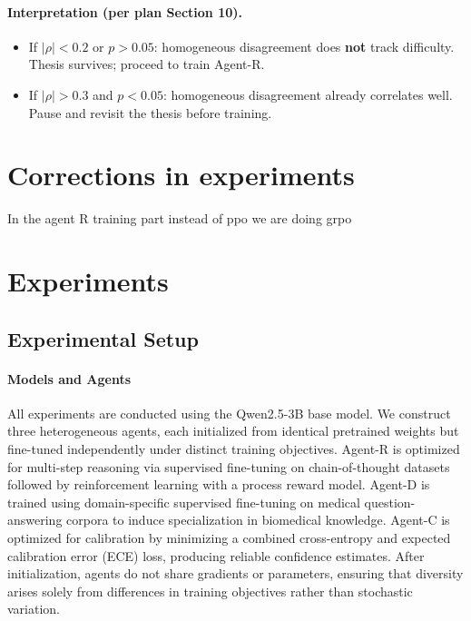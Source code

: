\documentclass{article}
\begin{document}
\paragraph{Interpretation (per plan Section 10).}
\begin{itemize}
    \item If $|\rho| < 0.2$ or $p > 0.05$: homogeneous disagreement does \textbf{not} track difficulty. Thesis survives; proceed to train Agent-R.
    \item If $|\rho| > 0.3$ and $p < 0.05$: homogeneous disagreement already correlates well. Pause and revisit the thesis before training.
\end{itemize}
\section{Corrections in experiments}
In the agent R training part instead of ppo we are doing grpo
\section{Experiments}

\subsection{Experimental Setup}

\paragraph{Models and Agents}
All experiments are conducted using the Qwen2.5-3B base model. We construct three heterogeneous agents, each initialized from identical pretrained weights but fine-tuned independently under distinct training objectives. Agent-R is optimized for multi-step reasoning via supervised fine-tuning on chain-of-thought datasets followed by reinforcement learning with a process reward model. Agent-D is trained using domain-specific supervised fine-tuning on medical question-answering corpora to induce specialization in biomedical knowledge. Agent-C is optimized for calibration by minimizing a combined cross-entropy and expected calibration error (ECE) loss, producing reliable confidence estimates. After initialization, agents do not share gradients or parameters, ensuring that diversity arises solely from differences in training objectives rather than stochastic variation.
\end{document}
